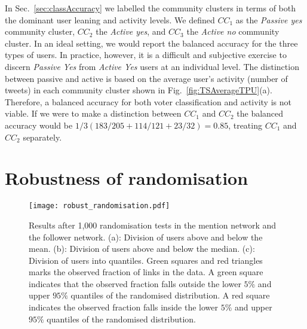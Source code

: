 \documentclass{article}
\begin{document}
In Sec.~\ref{sec:classAccuracy} we labelled the community clusters in
terms of both the dominant user leaning and activity levels. We
defined $CC_1$ as the {\it Passive yes} community cluster, $CC_2$ the
{\it Active yes}, and $CC_3$ the {\it Active no} community cluster. In
an ideal setting, we would report the balanced accuracy for the three
types of users. In practice, however, it is a difficult and subjective
exercise to discern {\it Passive Yes} from {\it Active Yes} users at
an individual level. The distinction between passive and active is
based on the average user's activity (number of tweets) in each
community cluster shown in Fig.~\ref{fig:TSAverageTPU}(a). Therefore,
a balanced accuracy for both voter classification and activity is not
viable. If we were to make a distinction between
$CC_1$ and $CC_2$ the balanced accuracy would be $1/3(183/205 + 114/121 +
23/32)=0.85$, treating $CC_1$ and $CC_2$ separately.

%

\section{Robustness of randomisation}\label{app:randomAlternative}


\begin{figure}[t]
  \centering
  \texttt{[image: robust\_randomisation.pdf]}
  \caption{Results after 1,000 randomisation tests in the mention
    network and the follower network. (a): Division of users above and
    below the mean. (b): Division of users above and below the median.
    (c): Division of users into quantiles. Green squares and red
    triangles marks the observed fraction of links in the data. A
    green square indicates that the observed fraction falls outside
    the lower $5\%$ and upper $95\%$ quantiles of the randomised
    distribution. A red square indicates the observed fraction falls
    inside the lower $5\%$ and upper $95\%$ quantiles of the
    randomised distribution.}
        \label{fig:robustres}
\end{figure}
\end{document}
